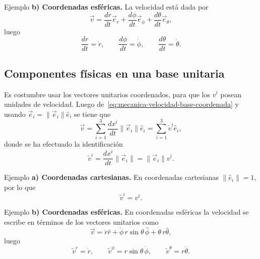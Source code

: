 \documentclass[../apunte_mecanica_clasica.tex]{subfiles}%
\begin{document}
\begin{apuntebloque}{Ejemplo}
\textbf{b) Coordenadas esféricas.} La velocidad está dada por
\begin{equation*}
    \vec v=\frac{dr}{dt}\vec e_r+\frac{d\phi}{dt}\vec e_\phi+\frac{d\theta}{dt}\vec e_\theta,
\end{equation*}
luego
\begin{equation*}
    \frac{dr}{dt}=\dot r,
    \qquad
    \frac{d\phi}{dt}=\dot\phi,
    \qquad
    \frac{d\theta}{dt}=\dot\theta.
\end{equation*}
\end{apuntebloque}

\subsection{Componentes físicas en una base unitaria}

Es costumbre usar los vectores unitarios coordenados, para que los $v^i$ posean unidades de velocidad. Luego de~\eqref{eq:mecanica-velocidad-base-coordenada} y usando $\vec e_i=\|\vec e_i\|\hat e_i$ se tiene que
\begin{equation*}
    \vec v=\sum_{i=1}^{3}\frac{dx^i}{dt}\|\vec e_i\|\hat e_i
    =\sum_{i=1}^{3}\widetilde v^i\hat e_i,
\end{equation*}
donde se ha efectuado la identificación
\begin{equation}
    \widetilde v^i=\frac{dx^i}{dt}\|\vec e_i\|=\|\vec e_i\|v^i.
    \label{eq:mecanica-componentes-velocidad-unitaria}
\end{equation}

\begin{apuntebloque}{Ejemplo}
\textbf{a) Coordenadas cartesianas.} En coordenadas cartesianas $\|\hat e_i\|=1$, por lo que
\begin{equation*}
    \widetilde v^i=v^i.
\end{equation*}
\end{apuntebloque}

\begin{apuntebloque}{Ejemplo}
\textbf{b) Coordenadas esféricas.} En coordenadas esféricas la velocidad se escribe en términos de los vectores unitarios como
\begin{equation*}
    \vec v=\dot r\hat r+\dot\phi\,r\sin\theta\,\hat\phi+\dot\theta\,r\hat\theta,
\end{equation*}
luego
\begin{equation*}
    \widetilde v^r=\dot r,
    \qquad
    \widetilde v^\phi=r\sin\theta\,\dot\phi,
    \qquad
    \widetilde v^\theta=r\dot\theta.
\end{equation*}
\end{apuntebloque}
\end{document}
